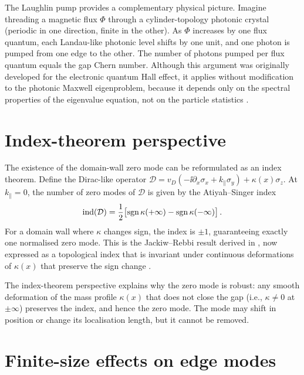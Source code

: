 The Laughlin pump provides a complementary physical picture.  Imagine
threading a magnetic flux $\Phi$ through a cylinder-topology photonic
crystal (periodic in one direction, finite in the other).  As $\Phi$
increases by one flux quantum, each Landau-like photonic level shifts
by one unit, and one photon is pumped from one edge to the other.
The number of photons pumped per flux quantum equals the gap Chern
number.  Although this argument was originally developed for the
electronic quantum Hall effect, it applies without modification to the
photonic Maxwell eigenproblem, because it depends only on the spectral
properties of the eigenvalue equation, not on the particle statistics
\cite{haldane2008possible}.

\section{Index-theorem perspective}
\label{sec:ch8-index}

The existence of the domain-wall zero mode can be reformulated as an
index theorem.  Define the Dirac-like operator
$\mathcal{D}=v_D(-\ii\partial_x\sigma_x+k_\parallel\sigma_y)
+\kappa(x)\sigma_z$.
At $k_\parallel=0$, the number of zero modes of $\mathcal{D}$ is
given by the Atiyah--Singer index
\begin{equation}\label{eq:ch8-index}
  \mathrm{ind}(\mathcal{D})
  = \frac{1}{2}\bigl[\operatorname{sgn}\kappa(+\infty)-\operatorname{sgn}\kappa(-\infty)\bigr]\,.
\end{equation}
For a domain wall where $\kappa$ changes sign, the index is $\pm 1$,
guaranteeing exactly one normalised zero mode.  This is the
Jackiw--Rebbi result derived in ,
now expressed as a topological index that is invariant under
continuous deformations of $\kappa(x)$ that preserve the sign change
\cite{ozawa2018topological}.

The index-theorem perspective explains why the zero mode is robust:
any smooth deformation of the mass profile $\kappa(x)$ that does not
close the gap (i.e., $\kappa\neq 0$ at $\pm\infty$) preserves the
index, and hence the zero mode.  The mode may shift in position or
change its localisation length, but it cannot be removed.

\section{Finite-size effects on edge modes}
\label{sec:ch8-finite-size}

